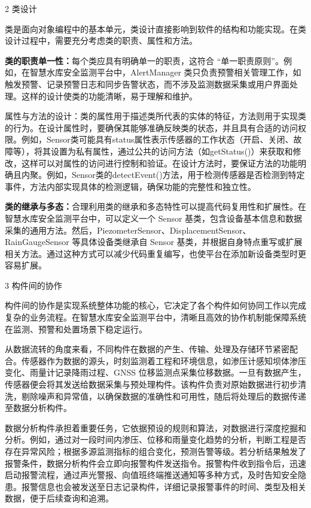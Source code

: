 2 类设计

类是面向对象编程中的基本单元，类设计直接影响到软件的结构和功能实现。在类设计过程中，需要充分考虑类的职责、属性和方法。

\textbf{类的职责单一性：}每个类应具有明确单一的职责，这符合 “单一职责原则”。例如，在智慧水库安全监测平台中，AlertManager 类只负责预警相关管理工作，如触发预警、记录预警日志和同步告警状态，而不涉及监测数据采集或用户界面处理。这样的设计使类的功能清晰，易于理解和维护。

属性与方法的设计：类的属性用于描述类所代表的实体的特征，方法则用于实现类的行为。在设计属性时，要确保其能够准确反映类的状态，并且具有合适的访问权限。例如，Sensor类可能具有status属性表示传感器的工作状态（开启、关闭、故障等），将其设置为私有属性，通过公共的访问方法（如getStatus()）来获取和修改，这样可以对属性的访问进行控制和验证。在设计方法时，要保证方法的功能明确且内聚。例如，Sensor类的detectEvent()方法，用于检测传感器是否检测到特定事件，方法内部实现具体的检测逻辑，确保功能的完整性和独立性。

\textbf{类的继承与多态：}合理利用类的继承和多态特性可以提高代码复用性和扩展性。在智慧水库安全监测平台中，可以定义一个 Sensor 基类，包含设备基本信息和数据采集的通用方法。然后，PiezometerSensor、DisplacementSensor、RainGaugeSensor 等具体设备类继承自 Sensor 基类，并根据自身特点重写或扩展相关方法。通过这种方式可以减少代码重复编写，也使平台在添加新设备类型时更容易扩展。

3 构件间的协作

构件间的协作是实现系统整体功能的核心，它决定了各个构件如何协同工作以完成复杂的业务流程。在智慧水库安全监测平台中，清晰且高效的协作机制能保障系统在监测、预警和处置场景下稳定运行。

从数据流转的角度来看，不同构件在数据的产生、传输、处理及存储环节紧密配合。传感器作为数据的源头，时刻监测着工程和环境信息，如渗压计感知坝体渗压变化、雨量计记录降雨过程、GNSS 位移监测点采集位移数据。一旦有数据产生，传感器便会将其发送给数据采集与预处理构件。该构件负责对原始数据进行初步清洗，剔除噪声和异常值，以确保数据的准确性和可用性，随后将处理后的数据传递至数据分析构件。

数据分析构件承担着重要任务，它依据预设的规则和算法，对数据进行深度挖掘和分析。例如，通过对一段时间内渗压、位移和雨量变化趋势的分析，判断工程是否存在异常风险；根据多源监测指标的组合变化，预测告警等级。若分析结果触发了报警条件，数据分析构件会立即向报警构件发送指令。报警构件收到指令后，迅速启动报警流程，通过声光警报、向值班终端推送通知等多种方式，及时告知安全隐患。报警信息也会被发送至日志记录构件，详细记录报警事件的时间、类型及相关数据，便于后续查询和追溯。


